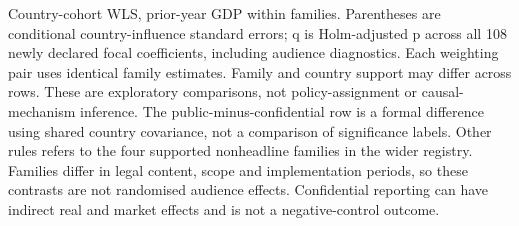 \documentclass[12pt,letterpaper]{article}
\begin{document}
{\noindent Country-cohort WLS, prior-year GDP within families. Parentheses are conditional country-influence standard errors; q is Holm-adjusted p across all 108 newly declared focal coefficients, including audience diagnostics. Each weighting pair uses identical family estimates. Family and country support may differ across rows. These are exploratory comparisons, not policy-assignment or causal-mechanism inference. The public-minus-confidential row is a formal difference using shared country covariance, not a comparison of significance labels. Other rules refers to the four supported nonheadline families in the wider registry. Families differ in legal content, scope and implementation periods, so these contrasts are not randomised audience effects. Confidential reporting can have indirect real and market effects and is not a negative-control outcome.

}
\end{document}
